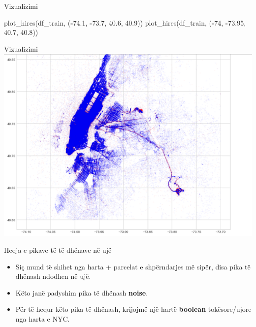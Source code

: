 \documentclass[
  ignorenonframetext,
]{beamer}
\newenvironment{Shaded}{\begin{snugshade}}{\end{snugshade}}
\newcommand{\DecValTok}[1]{\textcolor[rgb]{0.00,0.00,0.81}{#1}}
\newcommand{\FloatTok}[1]{\textcolor[rgb]{0.00,0.00,0.81}{#1}}
\newcommand{\NormalTok}[1]{#1}
\newcommand{\OperatorTok}[1]{\textcolor[rgb]{0.81,0.36,0.00}{\textbf{#1}}}
\begin{document}
\begin{frame}[fragile]{Vizualizimi}
\protect\hypertarget{vizualizimi-8}{}

\begin{Shaded}
\begin{Highlighting}[]
\NormalTok{plot\_hires(df\_train, (}\OperatorTok{{-}}\FloatTok{74.1}\NormalTok{, }\OperatorTok{{-}}\FloatTok{73.7}\NormalTok{, }\FloatTok{40.6}\NormalTok{, }\FloatTok{40.9}\NormalTok{))}
\NormalTok{plot\_hires(df\_train, (}\OperatorTok{{-}}\DecValTok{74}\NormalTok{, }\OperatorTok{{-}}\FloatTok{73.95}\NormalTok{, }\FloatTok{40.7}\NormalTok{, }\FloatTok{40.8}\NormalTok{))}
\end{Highlighting}
\end{Shaded}
\end{frame}

\begin{frame}{Vizualizimi}
\protect\hypertarget{vizualizimi-9}{}
\includegraphics{./Figs/train13.png}
\end{frame}

\begin{frame}{Heqja e pikave të të dhënave në ujë}
\protect\hypertarget{heqja-e-pikave-tuxeb-tuxeb-dhuxebnave-nuxeb-ujuxeb}{}
\begin{itemize}
\item
  Siç mund të shihet nga harta + parcelat e shpërndarjes më sipër, disa
  pika të dhënash ndodhen në ujë.
\item
  Këto janë padyshim pika të dhënash \textbf{noise}.
\item
  Për të hequr këto pika të dhënash, krijojmë një hartë \textbf{boolean}
  tokësore/ujore nga harta e NYC.
\end{itemize}
\end{frame}
\end{document}
